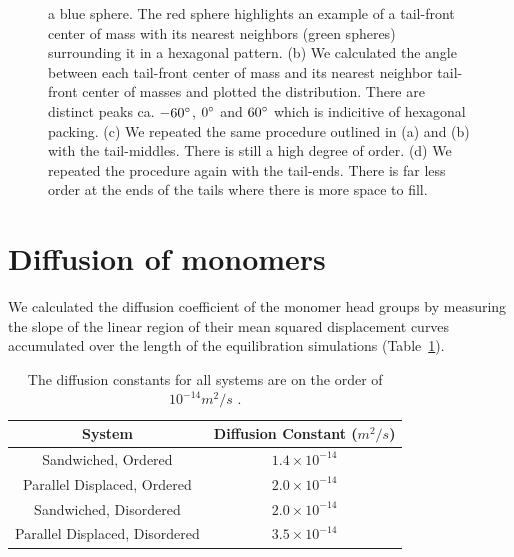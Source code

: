 \documentclass{article}
\begin{document}
\begin{figure}[!htb]
{        a blue sphere. The red sphere highlights an example of a tail-front 
        center of mass with its nearest neighbors (green spheres) surrounding it
        in a hexagonal pattern. (b) We calculated the angle between each tail-front
        center of mass and its nearest neighbor tail-front center of masses and 
        plotted the distribution. There are distinct peaks ca. $-60\degree$, $0\degree$ and
        $60\degree$ which is indicitive of hexagonal packing. (c) We repeated the 
        same procedure outlined in (a) and (b) with the tail-middles. There is still 
        a high degree of order. (d) We repeated the procedure again with the tail-ends.
        There is far less order at the ends of the tails where there is more
        space to fill.}\label{fig:tail_packing}
  \end{figure}
  
  \clearpage

  \section{Diffusion of monomers}

  We calculated the diffusion coefficient of the monomer head groups by measuring
  the slope of the linear region of their mean squared displacement curves accumulated
  over the length of the equilibration simulations (Table~\ref{table:msd}). 
  
  \begin{table}[h]
  \centering
  \begin{tabular}{cc}
  \toprule
  System & Diffusion Constant ($m^2/s$) \\ 
  \midrule
  Sandwiched, Ordered & $1.4 \times 10^{-14}$ \\
  Parallel Displaced, Ordered & $2.0 \times 10^{-14}$ \\
  Sandwiched, Disordered & $2.0 \times 10^{-14}$ \\
  Parallel Displaced, Disordered & $3.5 \times 10^{-14}$ \\
  \bottomrule
  \end{tabular}
  \caption{The diffusion constants for all systems are on the order of $10^{-14} m^2/s$ 
  .}~\label{table:msd}
  \end{table}
\end{document}
